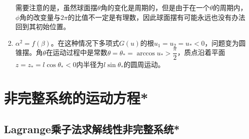 \begin{example}[球面摆的运动]
\begin{enumerate}
需要注意的是，虽然球面摆$\theta$角的变化是周期的，但是由于在一个$\theta$的周期内，$\phi$角的改变量与$2\pi$的比值不一定是有理数，因此球面摆有可能永远也没有办法回到其初始位置。

\item $\alpha^2=f(\beta)$。在这种情况下多项式$G(u)$的根$u_1=u_2=u_*<0$，问题变为圆锥摆。角$\theta$在运动过程中是常数$\theta=\theta_*=\arccos u_*>\dfrac{\pi}{2}$，质点沿着平面$z=z_*=l\cos\theta_*<0$内半径为$l\sin\theta_*$的圆周运动。
\end{enumerate}
\end{example}

\section{非完整系统的运动方程*}

\subsection{Lagrange乘子法求解线性非完整系统*}


